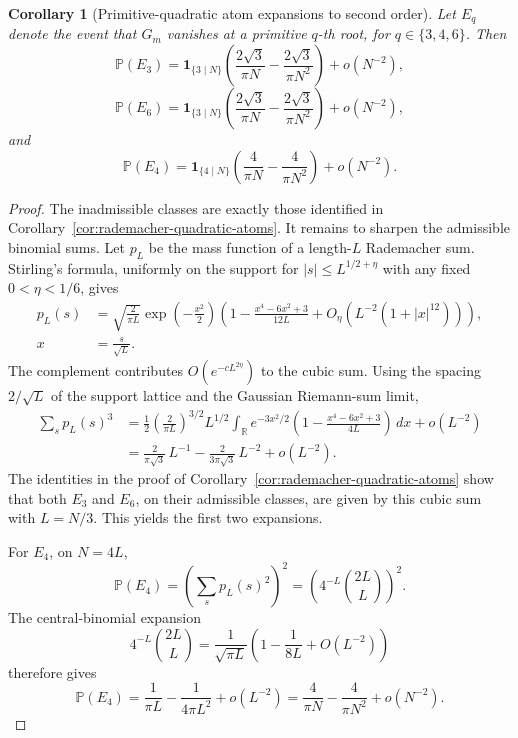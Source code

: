 \documentclass[11pt]{amsart}
\numberwithin{equation}{section}
\newtheorem{corollary}[theorem]{Corollary}
\theoremstyle{definition}
\theoremstyle{remark}
\newcommand{\Prob}{\mathbb P}
\newcommand{\abs}[1]{\left\lvert #1\right\rvert}
\begin{document}
\begin{corollary}[Primitive-quadratic atom expansions to second order]
\label{cor:rademacher-quadratic-second-order}
Let \(E_q\) denote the event that \(G_m\) vanishes at a primitive \(q\)-th root,
for \(q\in\{3,4,6\}\).  Then
\[
  \Prob(E_3)=\mathbf1_{\{3\mid N\}}
  \left(\frac{2\sqrt3}{\pi N}-\frac{2\sqrt3}{\pi N^2}\right)
  +o(N^{-2}),
\]
\[
  \Prob(E_6)=\mathbf1_{\{3\mid N\}}
  \left(\frac{2\sqrt3}{\pi N}-\frac{2\sqrt3}{\pi N^2}\right)
  +o(N^{-2}),
\]
and
\[
  \Prob(E_4)=\mathbf1_{\{4\mid N\}}
  \left(\frac4{\pi N}-\frac4{\pi N^2}\right)+o(N^{-2}).
\]
\end{corollary}

\begin{proof}
The inadmissible classes are exactly those identified in
Corollary~\ref{cor:rademacher-quadratic-atoms}.  It remains to sharpen the
admissible binomial sums.  Let \(p_L\) be the mass function of a length-\(L\)
Rademacher sum.  Stirling's formula, uniformly on the support for
\(\abs{s}\le L^{1/2+\eta}\) with any fixed \(0<\eta<1/6\), gives
\[
\begin{aligned}
  p_L(s)
  &=\sqrt{\frac{2}{\pi L}}\exp\!\left(-\frac{x^2}{2}\right)
    \left(1-\frac{x^4-6x^2+3}{12L}
      +O_\eta(L^{-2}(1+\abs{x}^{12}))\right),\\
  x&=\frac{s}{\sqrt L}.
\end{aligned}
\]
The complement contributes \(O(e^{-cL^{2\eta}})\) to the cubic sum.  Using the
spacing \(2/\sqrt L\) of the support lattice and the Gaussian Riemann-sum limit,
\[
\begin{aligned}
  \sum_s p_L(s)^3
  &=\frac12\left(\frac2{\pi L}\right)^{3/2}L^{1/2}
    \int_\mathbb R e^{-3x^2/2}
    \left(1-\frac{x^4-6x^2+3}{4L}\right)\,dx
    +o(L^{-2})  \\
  &=\frac{2}{\pi\sqrt3}\,L^{-1}
    -\frac{2}{3\pi\sqrt3}\,L^{-2}+o(L^{-2}).
\end{aligned}
\]
The identities in the proof of Corollary~\ref{cor:rademacher-quadratic-atoms}
show that both \(E_3\) and \(E_6\), on their admissible classes, are given by
this cubic sum with \(L=N/3\).  This yields the first two expansions.

For \(E_4\), on \(N=4L\),
\[
  \Prob(E_4)=\left(\sum_s p_L(s)^2\right)^2
  =\left(4^{-L}\binom{2L}{L}\right)^2.
\]
The central-binomial expansion
\[
  4^{-L}\binom{2L}{L}
  =\frac1{\sqrt{\pi L}}\left(1-\frac1{8L}+O(L^{-2})\right)
\]
therefore gives
\[
  \Prob(E_4)=\frac1{\pi L}-\frac1{4\pi L^2}+o(L^{-2})
  =\frac4{\pi N}-\frac4{\pi N^2}+o(N^{-2}).
\]
\end{proof}
\end{document}
